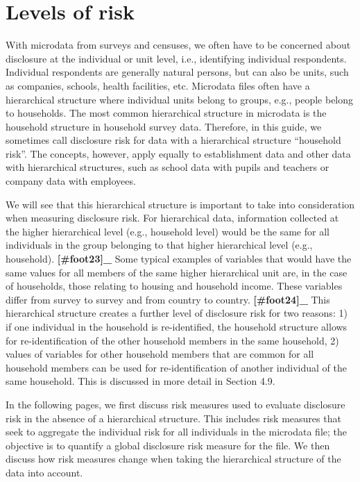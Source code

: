 \documentclass[letterpaper,10pt,english]{sphinxmanual}
\begin{document}
\section{Levels of risk}
\label{\detokenize{measure_risk:levels-of-risk}}
With microdata from surveys and censuses, we often have to be concerned
about disclosure at the individual or unit level, i.e., identifying
individual respondents. Individual respondents are generally natural
persons, but can also be units, such as companies, schools, health
facilities, etc. Microdata files often have a hierarchical structure
where individual units belong to groups, e.g., people belong to
households. The most common hierarchical structure in microdata is the
household structure in household survey data. Therefore, in this guide,
we sometimes call disclosure risk for data with a hierarchical structure
“household risk”. The concepts, however, apply equally to establishment
data and other data with hierarchical structures, such as school data
with pupils and teachers or company data with employees.

We will see that this hierarchical structure is important to take into
consideration when measuring disclosure risk. For hierarchical data,
information collected at the higher hierarchical level (e.g., household
level) would be the same for all individuals in the group belonging to
that higher hierarchical level (e.g., household). {\color{red}\bfseries{}{[}\#foot23{]}\_}
Some typical examples of variables that would have the same values for
all members of the same higher hierarchical unit are, in the case of
households, those relating to housing and household income. These
variables differ from survey to survey and from country to
country. {\color{red}\bfseries{}{[}\#foot24{]}\_} This hierarchical structure creates a
further level of disclosure risk for two reasons: 1) if one individual
in the household is re-identified, the household structure allows for
re-identification of the other household members in the same household,
2) values of variables for other household members that are common for
all household members can be used for re-identification of another
individual of the same household. This is discussed in more detail in
Section 4.9.

In the following pages, we first discuss risk measures used to evaluate
disclosure risk in the absence of a hierarchical structure. This
includes risk measures that seek to aggregate the individual risk for
all individuals in the microdata file; the objective is to quantify a
global disclosure risk measure for the file. We then discuss how risk
measures change when taking the hierarchical structure of the data into
account.
\end{document}
